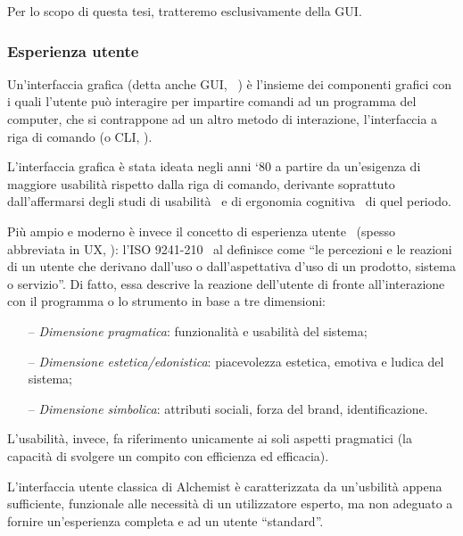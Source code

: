             Per lo scopo di questa tesi, tratteremo esclusivamente della GUI.

            \subsubsection{Esperienza utente}\label{subsub:prevUx}
                Un'interfaccia grafica (detta anche GUI, ~\cite{gui}) è l’insieme dei componenti grafici con i quali l'utente può interagire per impartire comandi ad un programma del computer, che si contrappone ad un altro metodo di interazione, l'interfaccia a riga di comando (o CLI, ).

                L'interfaccia grafica è stata ideata negli anni `80 a partire da un'esigenza di maggiore usabilità rispetto dalla riga di comando, derivante soprattuto dall'affermarsi degli studi di usabilità~\cite{norman1988} e di ergonomia cognitiva~\cite{cognitiveErgonomics} di quel periodo.

                Più ampio e moderno è invece il concetto di esperienza utente~\cite{ux} (spesso abbreviata in UX, ): l'ISO 9241-210~\cite{iso9241} al definisce come ``le percezioni e le reazioni di un utente che derivano dall’uso o dall’aspettativa d’uso di un prodotto, sistema o servizio''.
                Di fatto, essa descrive la reazione dell'utente di fronte all'interazione con il programma o lo strumento in base a tre dimensioni:
                \begin{itemize}
                    \item[--] \emph{Dimensione pragmatica}: funzionalità e usabilità del sistema;
                    \item[--] \emph{Dimensione estetica/edonistica}: piacevolezza estetica, emotiva e ludica del sistema;
                    \item[--] \emph{Dimensione simbolica}: attributi sociali, forza del brand, identificazione.
                \end{itemize}
                L'usabilità, invece, fa riferimento unicamente ai soli aspetti pragmatici (la capacità di svolgere un compito con efficienza ed efficacia).

                L'interfaccia utente classica di Alchemist è caratterizzata da un'usbilità appena sufficiente, funzionale alle necessità di un utilizzatore esperto, ma non adeguato a fornire un'esperienza completa e  ad un utente ``standard''.

